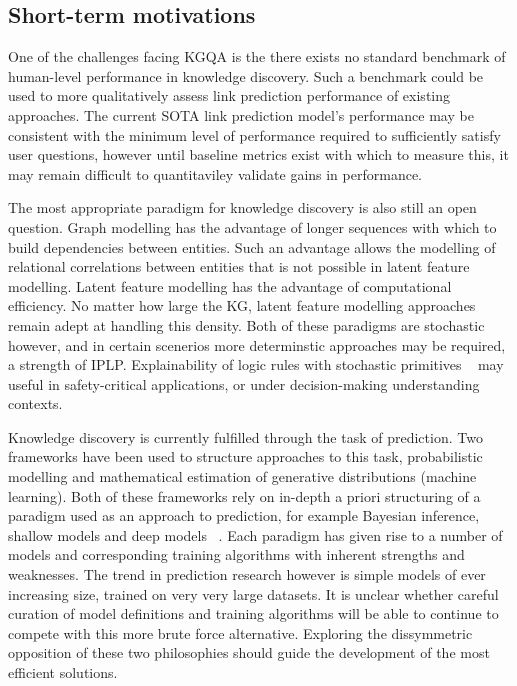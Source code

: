 \subsection{Short-term motivations}

One of the challenges facing KGQA is the there exists no standard benchmark of human-level performance in knowledge discovery. Such a benchmark could be used to more qualitatively assess link prediction performance of existing approaches. The current SOTA link prediction model's performance may be consistent with the minimum level of performance required to sufficiently satisfy user questions, however until baseline metrics exist with which to measure this, it may remain difficult to quantitaviley validate gains in performance. \par

\noindent The most appropriate paradigm for knowledge discovery is also still an open question. Graph modelling has the advantage of longer sequences with which to build dependencies between entities. Such an advantage allows the modelling of relational correlations between entities that is not possible in latent feature modelling. Latent feature modelling has the advantage of computational efficiency. No matter how large the KG, latent feature modelling approaches remain adept at handling this density. Both of these paradigms are stochastic however, and in certain scenerios more determinstic approaches may be required, a strength of IPLP. Explainability of logic rules with stochastic primitives \unskip~\citep{yang2017differentiable} may useful in safety-critical applications, or under decision-making understanding contexts. \par

\noindent Knowledge discovery is currently fulfilled through the task of prediction. Two frameworks have been used to structure approaches to this task, probabilistic modelling and mathematical estimation of generative distributions (machine learning). Both of these frameworks rely on in-depth a priori structuring of a paradigm used as an approach to prediction, for example Bayesian inference, shallow models and deep models \unskip~\citep{murphy2012machine}. Each paradigm has given rise to a number of models and corresponding training algorithms with inherent strengths and weaknesses. The trend in prediction research however is simple models of ever increasing size, trained on very very large datasets. It is unclear whether careful curation of model definitions and training algorithms will be able to continue to compete with this more brute force alternative. Exploring the dissymmetric opposition of these two philosophies should guide the development of the most efficient solutions.

